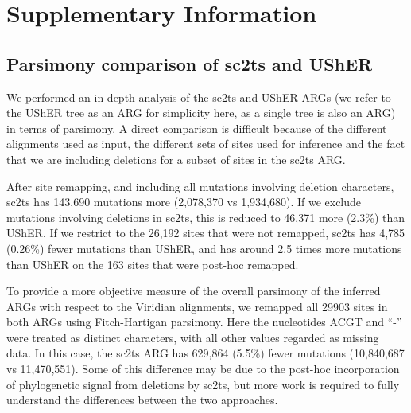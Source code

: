 \documentclass[12pt]{article}
\begin{document}



%



\newpage

\section*{Supplementary Information}
\appendix

\setcounter{table}{0}
\setcounter{figure}{0}
\renewcommand{\thetable}{S\arabic{table}}
\renewcommand{\thefigure}{S\arabic{figure}}
\renewcommand{\thesubsection}{\arabic{subsection}}

\subsection{Parsimony comparison of sc2ts and UShER}
\label{sec:supplement_sc2ts_usher_parsimony}

We performed an in-depth analysis of the sc2ts and UShER ARGs
(we refer to the UShER tree as an ARG for simplicity here,
as a single tree is also an ARG) in terms of parsimony.
A direct comparison is difficult because of
the different alignments used as input,
the different sets of sites used for inference and
the fact that we are including deletions
for a subset of sites in the sc2ts ARG.

After site remapping, and including all mutations involving
deletion characters, sc2ts has 143,690 mutations more
(2,078,370 vs 1,934,680). If we exclude mutations involving
deletions in sc2ts, this is reduced to 46,371 more (2.3\%) than UShER.
If we restrict to the 26,192 sites that were not remapped,
sc2ts has 4,785 (0.26\%) fewer mutations than UShER,
and has around 2.5 times more mutations than UShER
on the 163 sites that were post-hoc remapped.

To provide a more objective measure of the overall parsimony
of the inferred ARGs with respect to the Viridian alignments,
we remapped all 29903 sites in both ARGs
using Fitch-Hartigan parsimony. Here the nucleotides
ACGT and ``-'' were treated as distinct characters, with all
other values regarded as missing data. In this case, the sc2ts
ARG has 629,864 (5.5\%) fewer mutations (10,840,687
vs 11,470,551). Some of this difference may be due to the
post-hoc incorporation of phylogenetic signal from deletions
by sc2ts, but more work is required to fully understand
the differences between the two approaches.
\end{document}
